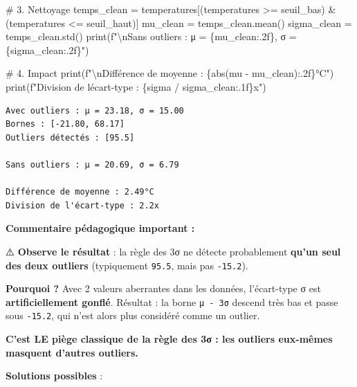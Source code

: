 \documentclass[
  french,
  11pt,
  a4paper,
]{scrbook}
\newenvironment{Shaded}{}{}
\newcommand{\BuiltInTok}[1]{\textcolor[rgb]{0.84,0.23,0.29}{#1}}
\newcommand{\CharTok}[1]{\textcolor[rgb]{0.01,0.18,0.38}{#1}}
\newcommand{\CommentTok}[1]{\textcolor[rgb]{0.42,0.45,0.49}{#1}}
\newcommand{\NormalTok}[1]{\textcolor[rgb]{0.14,0.16,0.18}{#1}}
\newcommand{\OperatorTok}[1]{\textcolor[rgb]{0.14,0.16,0.18}{#1}}
\newcommand{\SpecialCharTok}[1]{\textcolor[rgb]{0.00,0.36,0.77}{#1}}
\newcommand{\SpecialStringTok}[1]{\textcolor[rgb]{0.01,0.18,0.38}{#1}}
\begin{document}
\begin{tcolorbox}
\begin{Shaded}
\begin{Highlighting}[]
\CommentTok{\# 3. Nettoyage}
\NormalTok{temps\_clean }\OperatorTok{=}\NormalTok{ temperatures[(temperatures }\OperatorTok{\textgreater{}=}\NormalTok{ seuil\_bas) }\OperatorTok{\&}\NormalTok{ (temperatures }\OperatorTok{\textless{}=}\NormalTok{ seuil\_haut)]}
\NormalTok{mu\_clean }\OperatorTok{=}\NormalTok{ temps\_clean.mean()}
\NormalTok{sigma\_clean }\OperatorTok{=}\NormalTok{ temps\_clean.std()}
\BuiltInTok{print}\NormalTok{(}\SpecialStringTok{f"}\CharTok{\textbackslash{}n}\SpecialStringTok{Sans outliers : μ = }\SpecialCharTok{\{}\NormalTok{mu\_clean}\SpecialCharTok{:.2f\}}\SpecialStringTok{, σ = }\SpecialCharTok{\{}\NormalTok{sigma\_clean}\SpecialCharTok{:.2f\}}\SpecialStringTok{"}\NormalTok{)}

\CommentTok{\# 4. Impact}
\BuiltInTok{print}\NormalTok{(}\SpecialStringTok{f"}\CharTok{\textbackslash{}n}\SpecialStringTok{Différence de moyenne : }\SpecialCharTok{\{}\BuiltInTok{abs}\NormalTok{(mu }\OperatorTok{{-}}\NormalTok{ mu\_clean)}\SpecialCharTok{:.2f\}}\SpecialStringTok{°C"}\NormalTok{)}
\BuiltInTok{print}\NormalTok{(}\SpecialStringTok{f"Division de l\textquotesingle{}écart{-}type : }\SpecialCharTok{\{}\NormalTok{sigma }\OperatorTok{/}\NormalTok{ sigma\_clean}\SpecialCharTok{:.1f\}}\SpecialStringTok{x"}\NormalTok{)}
\end{Highlighting}
\end{Shaded}

\begin{verbatim}
Avec outliers : μ = 23.18, σ = 15.00
Bornes : [-21.80, 68.17]
Outliers détectés : [95.5]

Sans outliers : μ = 20.69, σ = 6.79

Différence de moyenne : 2.49°C
Division de l'écart-type : 2.2x
\end{verbatim}

\textbf{Commentaire pédagogique important :}

⚠️ \textbf{Observe le résultat} : la règle des 3σ ne détecte
probablement \textbf{qu'un seul des deux outliers} (typiquement
\texttt{95.5}, mais pas \texttt{-15.2}).

\textbf{Pourquoi ?} Avec 2 valeurs aberrantes dans les données,
l'écart-type σ est \textbf{artificiellement gonflé}. Résultat : la borne
\texttt{μ\ -\ 3σ} descend très bas et passe sous \texttt{-15.2}, qui
n'est alors plus considéré comme un outlier.

\textbf{C'est LE piège classique de la règle des 3σ : les outliers
eux-mêmes masquent d'autres outliers.}

\textbf{Solutions possibles} :


\end{tcolorbox}
\end{document}
